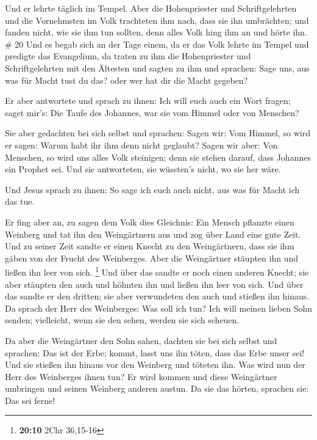 Und er lehrte täglich im Tempel. Aber die Hohenpriester
und Schriftgelehrten und die Vornehmsten im Volk trachteten ihm nach,
dass sie ihn umbrächten;  und fanden nicht, wie sie ihm
tun sollten, denn alles Volk hing ihm an und hörte ihn. \# 20
 Und es begab sich an der Tage einem, da er das Volk
lehrte im Tempel und predigte das Evangelium, da traten zu ihm die
Hohenpriester und Schriftgelehrten mit den Ältesten  und
sagten zu ihm und sprachen: Sage uns, aus was für Macht tust du das?
oder wer hat dir die Macht gegeben?

 Er aber antwortete und sprach zu ihnen: Ich will euch
auch ein Wort fragen; saget mir's:  Die Taufe des
Johannes, war sie vom Himmel oder von Menschen?

 Sie aber gedachten bei sich selbst und sprachen: Sagen
wir: Vom Himmel, so wird er sagen: Warum habt ihr ihm denn nicht
geglaubt?  Sagen wir aber: Von Menschen, so wird uns alles
Volk steinigen; denn sie stehen darauf, dass Johannes ein Prophet sei.
 Und sie antworteten, sie wüssten's nicht, wo sie her
wäre.

 Und Jesus sprach zu ihnen: So sage ich euch auch nicht,
aus was für Macht ich das tue.

 Er fing aber an, zu sagen dem Volk dies Gleichnis: Ein
Mensch pflanzte einen Weinberg und tat ihn den Weingärtnern aus und zog
über Land eine gute Zeit.  Und zu seiner Zeit sandte er
einen Knecht zu den Weingärtnern, dass sie ihm gäben von der Frucht des
Weinberges. Aber die Weingärtner stäupten ihn und ließen ihn leer von
sich. \footnote{\textbf{20:10} 2Chr 36,15-16}  Und über
das sandte er noch einen anderen Knecht; sie aber stäupten den auch und
höhnten ihn und ließen ihn leer von sich.  Und über das
sandte er den dritten; sie aber verwundeten den auch und stießen ihn
hinaus.  Da sprach der Herr des Weinberges: Was soll ich
tun? Ich will meinen lieben Sohn senden; vielleicht, wenn sie den sehen,
werden sie sich scheuen.

 Da aber die Weingärtner den Sohn sahen, dachten sie bei
sich selbst und sprachen: Das ist der Erbe; kommt, lasst uns ihn töten,
dass das Erbe unser sei!  Und sie stießen ihn hinaus vor
den Weinberg und töteten ihn. Was wird nun der Herr des Weinberges ihnen
tun?  Er wird kommen und diese Weingärtner umbringen und
seinen Weinberg anderen austun. Da sie das hörten, sprachen sie: Das sei
ferne!

